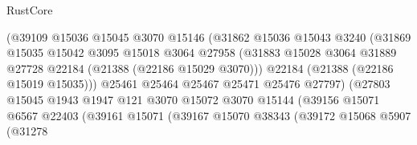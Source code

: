 \begin{lexlean}{RustCore}
\begin{coremodule}
                                    (@39109
                                      @15036
                                      @15045
                                      @3070
                                      @15146
                                      (@31862
                                        @15036
                                        @15043
                                        @3240
                                        (@31869
                                          @15035
                                          @15042
                                          @3095
                                          @15018
                                          @3064
                                          @27958
                                          (@31883
                                            @15028
                                            @3064
                                            @31889
                                            @27728
                                            @22184
                                            (@21388 (@22186 @15029 @3070)))
                                          @22184
                                          (@21388 (@22186 @15019 @15035)))
                                        @25461
                                        @25464
                                        @25467
                                        @25471
                                        @25476
                                        @27797)
                                      (@27803
                                        @15045
                                        @1943
                                        @1947
                                        @121
                                        @3070
                                        @15072
                                        @3070
                                        @15144
                                        (@39156
                                          @15071
                                          @6567
                                          @22403
                                          (@39161
                                            @15071
                                            (@39167
                                              @15070
                                              @38343
                                              (@39172
                                                @15068
                                                @5907
                                                (@31278

\end{coremodule}
\end{lexlean}
